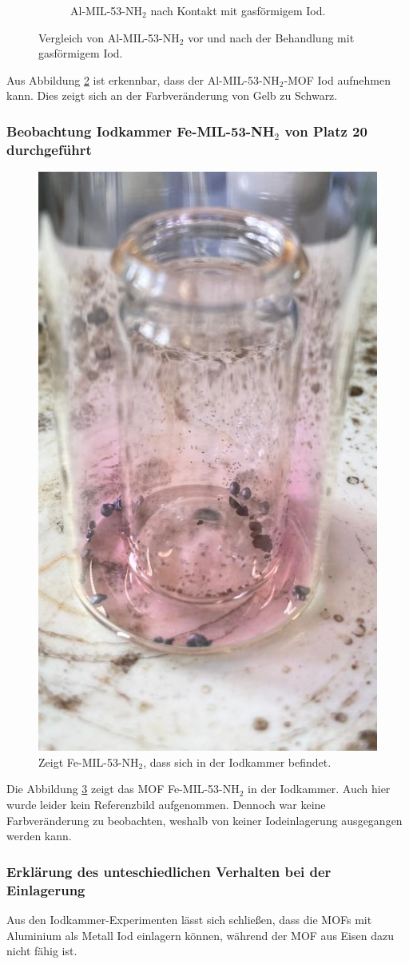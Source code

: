 \documentclass[12pt, a4paper]{article}
\begin{document}
\begin{figure}[h!]
\begin{subfigure}[b]{0.48\textwidth}
        \caption{Al-MIL-53-NH$_2$ nach Kontakt mit gasförmigem Iod.}
        \label{VergleichMOF25IInach}
    \end{subfigure}
    \caption{Vergleich von Al-MIL-53-NH$_2$ vor und nach der Behandlung mit gasförmigem Iod.}
    \label{VergleichMOF25II}
\end{figure}

\noindent
Aus Abbildung \ref{VergleichMOF25II} ist erkennbar, dass der Al-MIL-53-NH$_2$-MOF Iod aufnehmen kann. Dies zeigt sich an der Farbveränderung von Gelb zu Schwarz.


\newpage

\subsubsection{\texorpdfstring{Beobachtung Iodkammer Fe-MIL-53-NH$_2$ von Platz 20 durchgeführt}{Beobachtung Iodkammer Fe-MIL-53-NH2von Platz 20 durchgeführt}}

\begin{figure}[!h]
    \centering
    \includegraphics[width=0.25\linewidth]{MOF20II.jpg}
    \caption{Zeigt Fe-MIL-53-NH$_2$, dass sich in der Iodkammer befindet.}
    \label{MOF20II}
\end{figure}

\noindent
Die Abbildung \ref{MOF20II} zeigt das MOF Fe-MIL-53-NH$_2$ in der Iodkammer. Auch hier wurde leider kein Referenzbild aufgenommen. Dennoch war keine Farbveränderung zu beobachten, weshalb von keiner Iodeinlagerung ausgegangen werden kann.

\subsubsection{Erklärung des unteschiedlichen Verhalten bei der Einlagerung}
Aus den Iodkammer-Experimenten lässt sich schließen, dass die MOFs mit Aluminium als Metall Iod einlagern können, während der MOF aus Eisen dazu nicht fähig ist.
\end{document}
